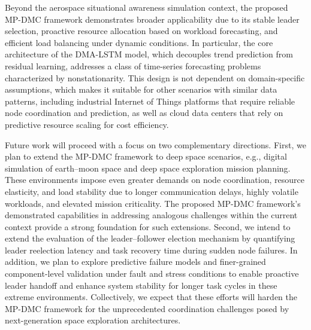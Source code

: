 \documentclass[twoside,twocolumn]{article}
\begin{document}
Beyond the aerospace situational awareness simulation context, the proposed MP-DMC framework demonstrates broader applicability due to its stable leader selection, proactive resource allocation based on workload forecasting, and efficient load balancing under dynamic conditions. In particular, the core architecture of the DMA-LSTM model, which decouples trend prediction from residual learning, addresses a class of time-series forecasting problems characterized by nonstationarity. This design is not dependent on domain-specific assumptions, which makes it suitable for other scenarios with similar data patterns, including industrial Internet of Things platforms that require reliable node coordination and prediction, as well as cloud data centers that rely on predictive resource scaling for cost efficiency.

Future work will proceed with a focus on two complementary directions. First, we plan to extend the MP-DMC framework to deep space scenarios, e.g., digital simulation of earth--moon space and deep space exploration mission planning. These environments impose even greater demands on node coordination, resource elasticity, and load stability due to longer communication delays, highly volatile workloads, and elevated mission criticality. The proposed MP-DMC framework's demonstrated capabilities in addressing analogous challenges within the current context provide a strong foundation for such extensions. Second, we intend to extend the evaluation of the leader--follower election mechanism by quantifying leader reelection latency and task recovery time during sudden node failures. In addition, we plan to explore predictive failure models and finer-grained component-level validation under fault and stress conditions to enable proactive leader handoff and enhance system stability for longer task cycles in these extreme environments. Collectively, we expect that these efforts will harden the MP-DMC framework for the unprecedented coordination challenges posed by next-generation space exploration architectures.

\balance
\end{document}
